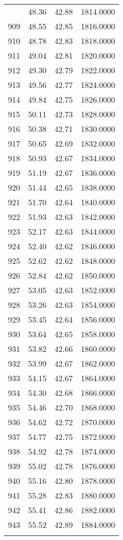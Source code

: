 \documentclass[
  captions=tableheading,
]{scrartcl}
\begin{document}
\begin{longtable} {l|l|l|l}
{908 &	48.36 &	42.88 &	1814.0000\\
909 &	48.55 &	42.85 &	1816.0000\\
910 &	48.78 &	42.83 &	1818.0000\\
911 &	49.04 &	42.81 &	1820.0000\\
912 &	49.30 &	42.79 &	1822.0000\\
913 &	49.56 &	42.77 &	1824.0000\\
914 &	49.84 &	42.75 &	1826.0000\\
915 &	50.11 &	42.73 &	1828.0000\\
916 &	50.38 &	42.71 &	1830.0000\\
917 &	50.65 &	42.69 &	1832.0000\\
918 &	50.93 &	42.67 &	1834.0000\\
919 &	51.19 &	42.67 &	1836.0000\\
920 &	51.44 &	42.65 &	1838.0000\\
921 &	51.70 &	42.64 &	1840.0000\\
922 &	51.93 &	42.63 &	1842.0000\\
923 &	52.17 &	42.63 &	1844.0000\\
924 &	52.40 &	42.62 &	1846.0000\\
925 &	52.62 &	42.62 &	1848.0000\\
926 &	52.84 &	42.62 &	1850.0000\\
927 &	53.05 &	42.63 &	1852.0000\\
928 &	53.26 &	42.63 &	1854.0000\\
929 &	53.45 &	42.64 &	1856.0000\\
930 &	53.64 &	42.65 &	1858.0000\\
931 &	53.82 &	42.66 &	1860.0000\\
932 &	53.99 &	42.67 &	1862.0000\\
933 &	54.15 &	42.67 &	1864.0000\\
934 &	54.30 &	42.68 &	1866.0000\\
935 &	54.46 &	42.70 &	1868.0000\\
936 &	54.62 &	42.72 &	1870.0000\\
937 &	54.77 &	42.75 &	1872.0000\\
938 &	54.92 &	42.78 &	1874.0000\\
939 &	55.02 &	42.78 &	1876.0000\\
940 &	55.16 &	42.80 &	1878.0000\\
941 &	55.28 &	42.83 &	1880.0000\\
942 &	55.41 &	42.86 &	1882.0000\\
943 &	55.52 &	42.89 &	1884.0000\\
}
\end{longtable}
\end{document}
